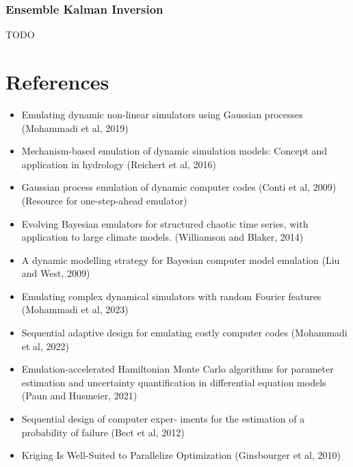 \documentclass[12pt]{article}
\begin{document}
\subsubsection{Ensemble Kalman Inversion}
TODO


 



\section{References}
\begin{itemize}
\item Emulating dynamic non-linear simulators using Gaussian processes (Mohammadi et al, 2019)
\item Mechanism-based emulation of dynamic simulation models: Concept and application in hydrology (Reichert et al, 2016)
\item Gaussian process emulation of dynamic computer codes (Conti et al, 2009) (Resource for one-step-ahead emulator)
\item Evolving Bayesian emulators for structured chaotic time series, with application to large climate models. (Williamson and Blaker, 2014)
\item A dynamic modelling strategy for Bayesian computer model emulation (Liu and West, 2009)
\item Emulating complex dynamical simulators with random Fourier features (Mohammadi et al, 2023)
\item Sequential adaptive design for emulating costly computer codes (Mohammadi et al, 2022)
\item Emulation-accelerated Hamiltonian Monte Carlo algorithms for parameter estimation and uncertainty quantification in differential equation models (Paun and Husmeier, 2021)
\item Sequential design of computer exper- iments for the estimation of a probability of failure (Bect et al, 2012)
\item Kriging Is Well-Suited to Parallelize Optimization (Ginsbourger et al, 2010)
\end{itemize}
\end{document}
